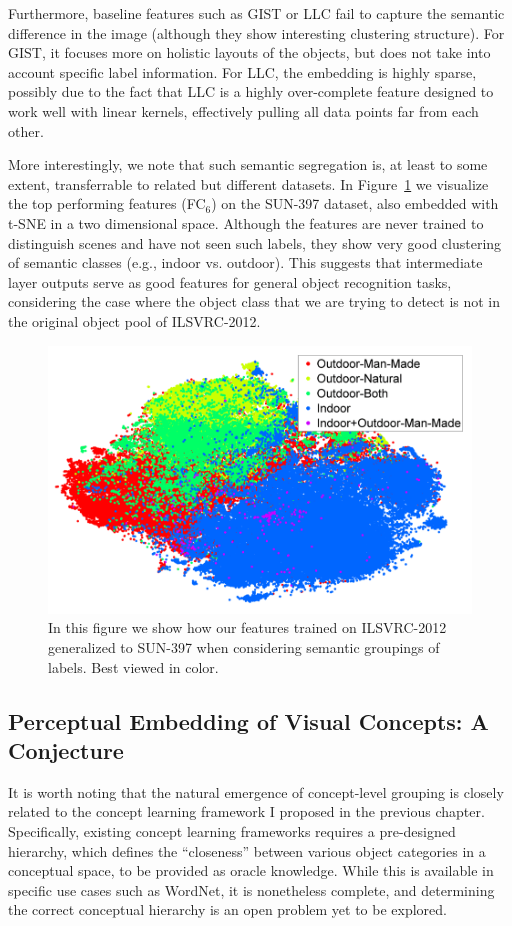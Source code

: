 Furthermore, baseline features such as GIST or LLC fail to capture the semantic difference in the image (although they show interesting clustering structure). For GIST, it focuses more on holistic layouts of the objects, but does not take into account specific label information. For LLC, the embedding is highly sparse, possibly due to the fact that LLC is a highly over-complete feature designed to work well with linear kernels, effectively pulling all data points far from each other.


More interestingly, we note that such semantic segregation is, at least to some extent, transferrable to related but different datasets. In Figure~\ref{fig:generalization} we visualize the top performing features (FC$_6$) on the SUN-397 dataset, also embedded with t-SNE in a two dimensional space. Although the features are never trained to distinguish scenes and have not seen such labels, they show very good clustering of semantic classes (e.g., indoor vs. outdoor). This suggests that intermediate layer outputs serve as good features for general object recognition tasks, considering the case where the object class that we are trying to detect is not in the original object pool of ILSVRC-2012.

\begin{figure}
\centering
\includegraphics[width=.6\linewidth]{figs/decaf/SUN397_quarter-fs8.png}
\caption{In this figure we show how our features trained on ILSVRC-2012 generalized to SUN-397 when considering semantic groupings of labels. Best viewed in color. \label{fig:generalization}}
\end{figure}

\subsection{Perceptual Embedding of Visual Concepts: A Conjecture}

It is worth noting that the natural emergence of concept-level grouping is closely related to the concept learning framework I proposed in the previous chapter. Specifically, existing concept learning frameworks requires a pre-designed hierarchy, which defines the ``closeness'' between various object categories in a conceptual space, to be provided as oracle knowledge. While this is available in specific use cases such as WordNet, it is nonetheless complete, and determining the correct conceptual hierarchy is an open problem yet to be explored.

